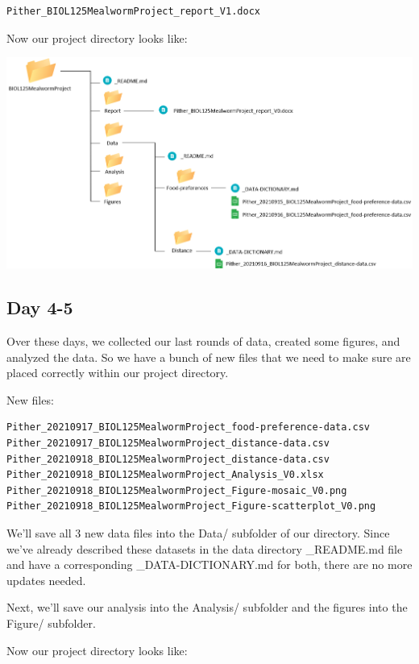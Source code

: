 \documentclass[
]{book}
\begin{document}
\begin{verbatim}
Pither_BIOL125MealwormProject_report_V1.docx
\end{verbatim}

Now our project directory looks like:

\includegraphics{images/DS_directory-example-3.png}

\hypertarget{day-4-5}{%
\subsection*{Day 4-5}\label{day-4-5}}

Over these days, we collected our last rounds of data, created some figures, and analyzed the data. So we have a bunch of new files that we need to make sure are placed correctly within our project directory.

New files:

\begin{verbatim}
Pither_20210917_BIOL125MealwormProject_food-preference-data.csv
Pither_20210917_BIOL125MealwormProject_distance-data.csv
Pither_20210918_BIOL125MealwormProject_distance-data.csv
Pither_20210918_BIOL125MealwormProject_Analysis_V0.xlsx
Pither_20210918_BIOL125MealwormProject_Figure-mosaic_V0.png
Pither_20210918_BIOL125MealwormProject_Figure-scatterplot_V0.png
\end{verbatim}

We'll save all 3 new data files into the Data/ subfolder of our directory. Since we've already described these datasets in the data directory \_README.md file and have a corresponding \_DATA-DICTIONARY.md for both, there are no more updates needed.

Next, we'll save our analysis into the Analysis/ subfolder and the figures into the Figure/ subfolder.

Now our project directory looks like:
\end{document}

